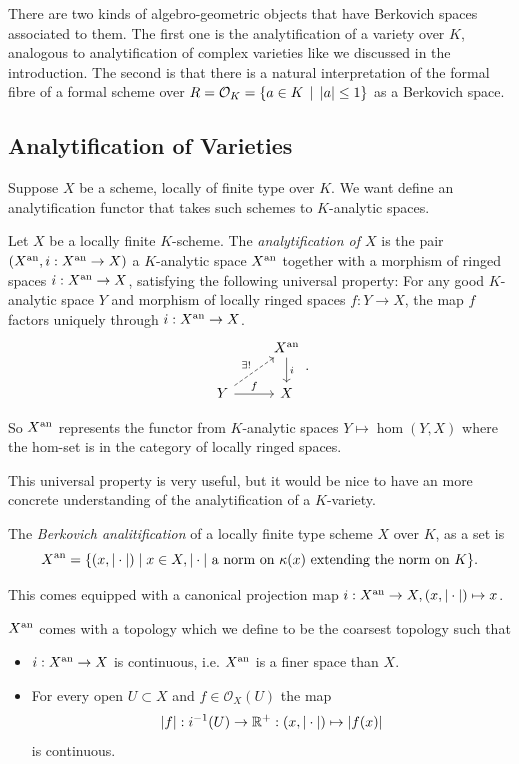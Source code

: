 There are two kinds of algebro-geometric objects that have Berkovich spaces associated to them. 
The first one is the analytification of a variety over $K$, analogous to analytification of complex varieties like we discussed in the introduction. 
The second is that there is a natural interpretation of the formal fibre of a formal scheme over $R = \mathcal{O}_K = \{a \in K \st |a| \le 1\} $ as a Berkovich space. 


\subsection{Analytification of Varieties} \label{sec:analytfication_of_varieties}


Suppose $X$ be a scheme, locally of finite type over $K$.  We want define an analytification functor that takes such schemes to $K$-analytic spaces.  
\begin{definition}
	Let  $X$ be a locally finite $K$-scheme. 
	The \emph{analytification of $X$} is the pair $(X{}^{\text{an}}, i: X{}^{\text{an}} \to X)$ a $K$-analytic space $X{}^{\text{an}}$ together with a morphism of ringed spaces $i: X{}^{\text{an}} \to X$, satisfying the following universal property:
	For any good $K$-analytic space $Y$ and morphism of locally ringed spaces $f: Y \to X$, the map $f$ factors uniquely through $i: X{}^{\text{an}} \to X$. 
	\[
	\begin{tikzcd}
		 & X\an \dar{i} \\
		Y \rar{f} \ar[dashed]{ur}{\exists !} & X
	\end{tikzcd}
	.\] 
\end{definition}
So $X{}^{\text{an}}$ represents the functor from $K$-analytic spaces $Y \mapsto \hom(Y, X)$ where the hom-set is in the category of locally ringed spaces. 

This universal property is very useful, but it would be nice to have an more concrete understanding of the analytification of a $K$-variety. 
\begin{definition}\label{def:berkovich_analytification_explicit}
	The \emph{Berkovich analitification} of a locally finite type scheme $X$ over  $K$, as a set is \[
		X{}^{\text{an}} = \{(x, |\cdot |)  \mid x\in X, |\cdot | \text{ a norm on } \kappa(x) \text{ extending the norm on }K \} 
	.\] 

	This comes equipped with a canonical projection map $i: X{}^{\text{an}} \to X, (x, |\cdot |) \mapsto  x$.
	
	$X{}^{\text{an}} $ comes with a topology which we define to be the coarsest topology such that 
	\begin{itemize}
		\item $i: X{}^{\text{an}} \to X$ is continuous, i.e. $X{}^{\text{an}}$ is a finer space than  $X$. 
		\item For every open $U \subset X$ and $f \in \mathcal{O}_X(U)$ the map  \[
				|f|: i^{-1}(U) \to \mathbb{R}^{+}: (x, |\cdot |) \mapsto  |f(x)|
		\] 
		is continuous.
	\end{itemize}

\end{definition}

